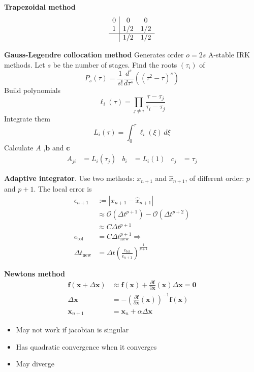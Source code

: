 \textbf{Trapezoidal method}
\begin{align*}
\begin{array}{c|cc}
    0 & 0 & 0 \\
    1  & 1/2 & 1/2 \\ \hline
     & 1/2 & 1/2
\end{array}
\end{align*}

\textbf{Gauss-Legendre collocation method}
Generates order \(o=2s\) A-stable IRK methods. Let \(s\) be the number of stages. Find the roots \((\tau_i)\) of 
\[P_s(\tau)=\frac{1}{s!}\frac{d^s}{d\tau^s}\left((\tau^2-\tau)^s\right)\]
Build polynomials
\[\ell_i(\tau) = \prod_{j\neq i}\frac{\tau-\tau_j}{\tau_i-\tau_j}\]
Integrate them
\[L_i(\tau) = \int_0^\tau\ell_i(\xi)\,d\xi\]
Calculate \(A\) ,\(\bm{b}\) and \(\bm{c}\)
\begin{align*}
    A_{ji} &= L_i(\tau_j) & b_i &= L_i(1) & c_j &=  \tau_j
\end{align*}

\textbf{Adaptive integrator}. 
Use two methods: \(x_{n+1}\) and \(\hat{x}_{n+1}\), of different order: \(p\) and \(p+1\). The local error is
\begin{align*}
    \epsilon_{n+1} &:= |x_{n+1}-\hat{x}_{n+1}| \\
    &\approx \mathcal{O}(\Delta t^{p+1})- \mathcal{O}(\Delta t^{p+2}) \\ 
    &\approx C\Delta t^{p+1} \\
    e_{\textrm{tol}} &=  C\Delta t^{p+1}_{\textrm{new}} \Rightarrow \\
    \Delta t_{\textrm{new}} &= \Delta t \left(\frac{e_{\textrm{tol}}}{\epsilon_{n+1}}\right)^{\frac{1}{p+1}}
\end{align*}

\textbf{Newtons method}
\begin{align*}
    \bm{f}(\bm{x}+\Delta \bm{x}) &\approx  \bm{f}(\bm{x}) + \frac{\partial \bm{f}}{\partial \bm{x}}(\bm{x})\Delta \bm{x}  = \bm{0} \\
    \Delta \bm{x} &= - \left(\frac{\partial \bm{f}}{\partial \bm{x}}(\bm{x})\right)^{-1}\bm{f}(\bm{x}) \\
    \bm{x}_{n+1} &= \bm{x}_n + \alpha \Delta \bm{x}
\end{align*}
\begin{itemize}
    \item May not work if jacobian is singular
    \item Has quadratic convergence when it converges
    \item May diverge
\end{itemize}

